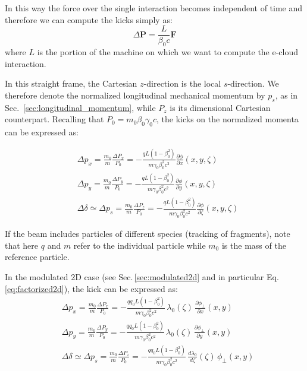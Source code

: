 In this way the force over the single interaction becomes independent of time and therefore we can compute the kicks simply as:
\begin{equation}
\Delta \textbf{P} = \frac{L}{\beta_0 c}\textbf{F} 
\end{equation}
where $L$ is the portion of the machine on which we want to compute the e-cloud interaction.

In this straight frame, the Cartesian $z$-direction is the local
$s$-direction. We therefore denote the normalized longitudinal mechanical
momentum by $p_s$, as in Sec.~\ref{sec:longitudinal_momentum}, while $P_z$
is its dimensional Cartesian counterpart.
Recalling that $P_0=m_0\beta_0\gamma_0c$, the kicks on the normalized
momenta can be expressed as:

\begin{align}
&\boxed{
\Delta p_x = \frac{m_0}{m}\frac{\Delta P_x} {P_0}= -\frac{qL (1-\beta_0^2)}{ m\gamma_0\beta_0^2 c^2} \frac{\partial \phi}{\partial x}\left(x, y,\zeta\right)}\label{dpx}\\
&\boxed{
\Delta p_y = \frac{m_0}{m}\frac{\Delta P_y} {P_0}= -\frac{qL (1-\beta_0^2)}{ m\gamma_0\beta_0^2 c^2} \frac{\partial \phi}{\partial y}\left(x, y,\zeta\right)}\label{dpy}\\
&\boxed{
\Delta \delta \simeq \Delta p_s = \frac{m_0}{m}\frac{\Delta P_z} {P_0}= -\frac{qL (1-\beta_0^2)}{ m\gamma_0\beta_0^2 c^2} \frac{\partial \phi}{\partial \zeta}\left(x, y,\zeta\right)}
\label{dpz}
\end{align}

If the beam includes particles of different species (tracking of fragments), note that here $q$ and $m$ refer to the individual particle while $m_0$ is the mass of the reference particle.



In the modulated 2D case (see Sec.\,\ref{sec:modulated2d} and in particular Eq.\,\ref{eq:factorized2d}), the kick can be expressed as:
\begin{align}
&\boxed{
\Delta p_x = \frac{m_0}{m}\frac{\Delta P_x} {P_0}= -\frac{qq_0L (1-\beta_0^2)}{ m\gamma_0\beta_0^2 c^2} \,\lambda_0(\zeta)\,\frac{\partial {\phi_\perp}}{\partial x}\left(x, y\right)}\label{dpx_mod}\\
&\boxed{
\Delta p_y = \frac{m_0}{m}\frac{\Delta P_y} {P_0}= -\frac{qq_0L (1-\beta_0^2)}{ m\gamma_0\beta_0^2 c^2} \,\lambda_0(\zeta)\, \frac{\partial{\phi_\perp}}{\partial y}\left(x, y\right)}\label{dpy_mod}\\
&\boxed{
\Delta \delta \simeq \Delta p_s = \frac{ m_0} {m}\frac{\Delta P_z} {P_0}= -\frac{qq_0L (1-\beta_0^2)}{ m\gamma_0\beta_0^2 c^2} \,\frac{d\lambda_0}{d\zeta}(\zeta)\,{\phi_\perp}\left(x, y\right)}\label{dpz_mod}
\end{align}

